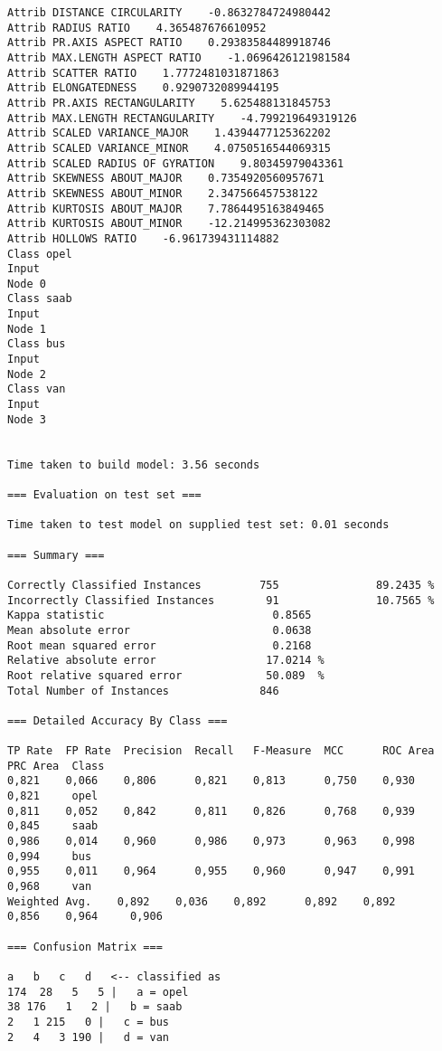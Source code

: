 \documentclass[
	article,			%
	11pt,				%
	oneside,			%
	a4paper,			%
	english,			%
	brazil,				%
	sumario=tradicional
	]{abntex2}
\begin{document}
\begin{lstlisting}
Attrib DISTANCE CIRCULARITY    -0.8632784724980442
Attrib RADIUS RATIO    4.365487676610952
Attrib PR.AXIS ASPECT RATIO    0.29383584489918746
Attrib MAX.LENGTH ASPECT RATIO    -1.0696426121981584
Attrib SCATTER RATIO    1.7772481031871863
Attrib ELONGATEDNESS    0.9290732089944195
Attrib PR.AXIS RECTANGULARITY    5.625488131845753
Attrib MAX.LENGTH RECTANGULARITY    -4.799219649319126
Attrib SCALED VARIANCE_MAJOR    1.4394477125362202
Attrib SCALED VARIANCE_MINOR    4.0750516544069315
Attrib SCALED RADIUS OF GYRATION    9.80345979043361
Attrib SKEWNESS ABOUT_MAJOR    0.7354920560957671
Attrib SKEWNESS ABOUT_MINOR    2.347566457538122
Attrib KURTOSIS ABOUT_MAJOR    7.7864495163849465
Attrib KURTOSIS ABOUT_MINOR    -12.214995362303082
Attrib HOLLOWS RATIO    -6.961739431114882
Class opel
Input
Node 0
Class saab
Input
Node 1
Class bus
Input
Node 2
Class van
Input
Node 3


Time taken to build model: 3.56 seconds

=== Evaluation on test set ===

Time taken to test model on supplied test set: 0.01 seconds

=== Summary ===

Correctly Classified Instances         755               89.2435 %
Incorrectly Classified Instances        91               10.7565 %
Kappa statistic                          0.8565
Mean absolute error                      0.0638
Root mean squared error                  0.2168
Relative absolute error                 17.0214 %
Root relative squared error             50.089  %
Total Number of Instances              846     

=== Detailed Accuracy By Class ===

TP Rate  FP Rate  Precision  Recall   F-Measure  MCC      ROC Area  PRC Area  Class
0,821    0,066    0,806      0,821    0,813      0,750    0,930     0,821     opel
0,811    0,052    0,842      0,811    0,826      0,768    0,939     0,845     saab
0,986    0,014    0,960      0,986    0,973      0,963    0,998     0,994     bus
0,955    0,011    0,964      0,955    0,960      0,947    0,991     0,968     van
Weighted Avg.    0,892    0,036    0,892      0,892    0,892      0,856    0,964     0,906     

=== Confusion Matrix ===

a   b   c   d   <-- classified as
174  28   5   5 |   a = opel
38 176   1   2 |   b = saab
2   1 215   0 |   c = bus
2   4   3 190 |   d = van


\end{lstlisting}
\end{document}
